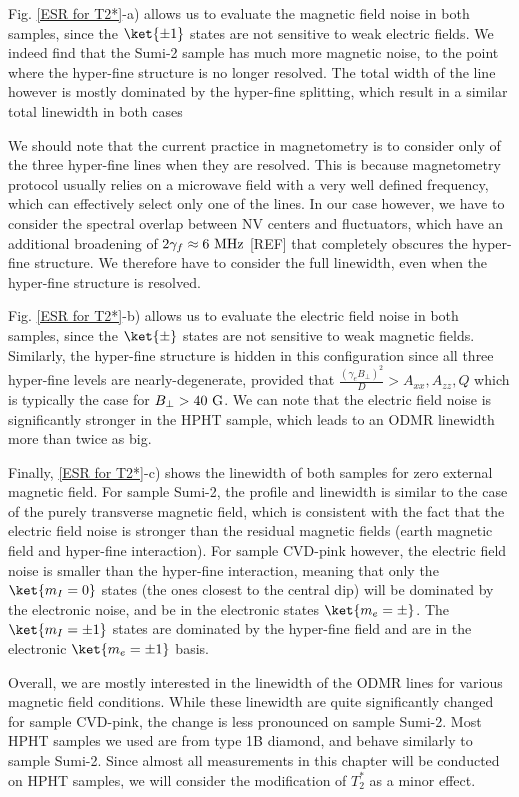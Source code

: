 \documentclass[a4paper,11pt]{report}
\begin{document}
Fig. \ref{ESR for T2*}-a) allows us to evaluate the magnetic field noise in both samples, since the $\ket{\pm 1}$ states are not sensitive to weak electric fields. We indeed find that the Sumi-2 sample has much more magnetic noise, to the point where the hyper-fine structure is no longer resolved. The total width of the line however is mostly dominated by the hyper-fine splitting, which result in a similar total linewidth in both cases

We should note that the current practice in magnetometry is to consider only of the three hyper-fine lines when they are resolved. This is because magnetometry protocol usually relies on a microwave field with a very well defined frequency, which can effectively select only one of the lines. In our case however, we have to consider the spectral overlap between NV centers and fluctuators, which have an additional broadening of $2\gamma_f \approx 6\ \rm MHz$ [REF] that completely obscures the hyper-fine structure. We therefore have to consider the full linewidth, even when the hyper-fine structure is resolved.

Fig. \ref{ESR for T2*}-b) allows us to evaluate the electric field noise in both samples, since the $\ket{\pm}$ states are not sensitive to weak magnetic fields. Similarly, the hyper-fine structure is hidden in this configuration since all three hyper-fine levels are nearly-degenerate, provided that $\frac{(\gamma_e B_\perp)^2}{D} > A_{xx},A_{zz},Q$ which is typically the case for $B_\perp > 40\ \rm G$. We can note that the electric field noise is significantly stronger in the HPHT sample, which leads to an ODMR linewidth more than twice as big.

Finally, \ref{ESR for T2*}-c) shows the linewidth of both samples for zero external magnetic field. For sample Sumi-2, the profile and linewidth is similar to the case of the purely transverse magnetic field, which is consistent with the fact that the electric field noise is stronger than the residual magnetic fields (earth magnetic field and hyper-fine interaction). For sample CVD-pink however, the electric field noise is smaller than the hyper-fine interaction, meaning that only the $\ket{m_I=0}$ states (the ones closest to the central dip) will be dominated by the electronic noise, and be in the electronic states $\ket{m_e=\pm}$. The $\ket{m_I=\pm 1}$ states are dominated by the hyper-fine field and are in the electronic $\ket{m_e=\pm 1}$ basis.

Overall, we are mostly interested in the linewidth of the ODMR lines for various magnetic field conditions. While these linewidth are quite significantly changed for sample CVD-pink, the change is less pronounced on sample Sumi-2. Most HPHT samples we used are from type 1B diamond, and behave similarly to sample Sumi-2. Since almost all measurements in this chapter will be conducted on HPHT samples, we will consider the modification of $T_2^*$ as a minor effect.
\end{document}
